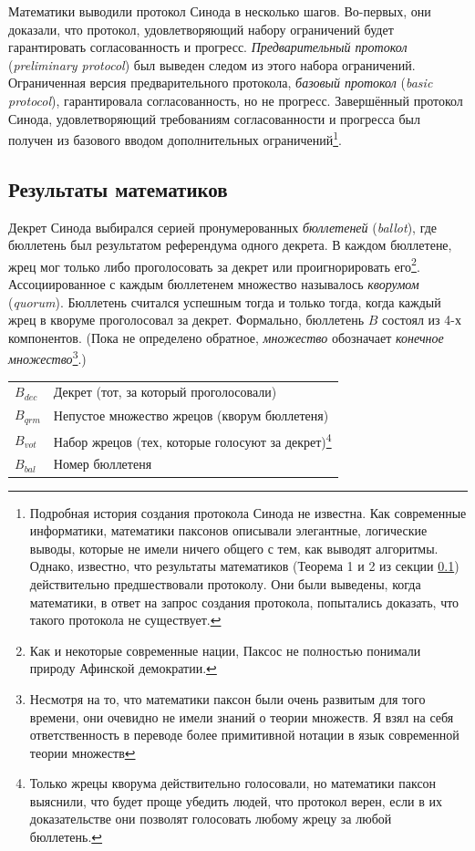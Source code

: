 \documentclass[12pt, a4paper]{article} %
\begin{document}
Математики выводили протокол Синода в несколько шагов. Во-первых, они доказали, что протокол, удовлетворяющий набору ограничений будет гарантировать согласованность  и прогресс. \textit{Предварительный протокол} (\textit{preliminary protocol}) был выведен следом из этого набора ограничений. Ограниченная  версия предварительного протокола, \textit{базовый протокол} (\textit{basic protocol}), гарантировала согласованность, но не прогресс. Завершённый протокол Синода, удовлетворяющий требованиям согласованности и прогресса был получен из базового вводом дополнительных ограничений\footnote{Подробная история создания протокола Синода не известна. Как современные информатики, математики паксонов описывали элегантные, логические выводы, которые не имели ничего общего с тем, как выводят алгоритмы. Однако, известно, что результаты математиков (Теорема 1 и 2 из секции \ref{sec:mathsupport}) действительно предшествовали протоколу. Они были выведены, когда математики, в ответ на запрос создания протокола, попытались доказать, что такого протокола не существует.
}.

\subsection{Результаты математиков}\label{sec:mathsupport}

Декрет Синода выбирался серией пронумерованных \textit{бюллетеней} (\textit{ballot}), где бюллетень был результатом референдума одного декрета. В каждом бюллетене, жрец мог только либо проголосовать за декрет или проигнорировать его\footnote{Как и некоторые современные нации, Паксос не полностью понимали природу Афинской демократии.}. Ассоциированное с каждым бюллетенем множество называлось \textit{кворумом} (\textit{quorum}). Бюллетень считался успешным тогда и только тогда, когда каждый жрец в кворуме проголосовал за декрет.  Формально, бюллетень $B$ состоял из 4-х компонентов. (Пока не определено обратное, \textit{множество} обозначает \textit{конечное множество}\footnote{Несмотря на то, что математики паксон были очень развитым для того времени, они очевидно не имели знаний о теории множеств. Я взял на себя ответственность в переводе более примитивной нотации в язык современной теории множеств}.)
\begin{table}[h]
\begin{tabular}{ l p{10.5cm}}
    $B_{dec}$ & Декрет (тот, за который проголосовали)\\
    $B_{qrm}$ & Непустое множество жрецов (кворум бюллетеня)\\
    $B_{vot}$ & Набор жрецов (тех, которые голосуют за декрет)\footnote{Только жрецы кворума действительно голосовали, но математики паксон выяснили, что будет проще убедить людей, что протокол верен, если в их доказательстве они позволят голосовать любому жрецу за любой бюллетень.}\\
    $B_{bal}$ & Номер бюллетеня
\end{tabular}
\end{table}
\end{document}
